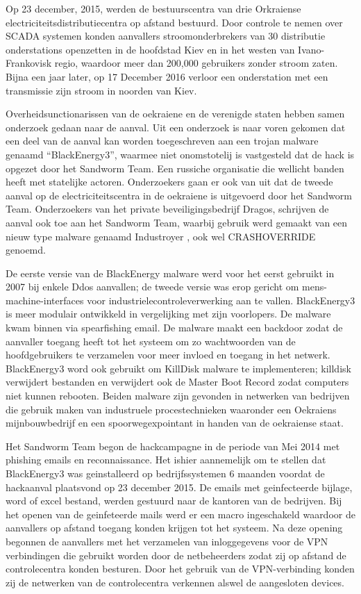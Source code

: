 		Op 23 december, 2015, werden de bestuurscentra van drie Orkraiense electriciteitsdistributiecentra
		op afstand bestuurd. Door controle te nemen over SCADA systemen konden aanvallers
		stroomonderbrekers van 30 distributie onderstations openzetten in de hoofdstad Kiev en in het
		westen van Ivano-Frankovisk regio, waardoor meer dan 200,000 gebruikers zonder stroom zaten.
		Bijna een jaar later, op 17 December 2016 verloor een onderstation met een transmissie zijn stroom
		in noorden van Kiev.
		
		Overheidsunctionarissen van de oekraiene en de verenigde staten hebben samen onderzoek gedaan
		naar de aanval. Uit een onderzoek is naar voren gekomen dat een deel van de aanval kan worden
		toegeschreven aan een trojan malware genaamd “BlackEnergy3”, waarmee niet onomstotelij is
		vastgesteld dat de hack is opgezet door het Sandworm Team. Een russiche organisatie die wellicht
		banden heeft met statelijke actoren. Onderzoekers gaan er ook van uit dat de tweede aanval op de
		electriciteitscentra in de oekraiene is uitgevoerd door het Sandworm Team. Onderzoekers van het
		private beveiligingsbedrijf Dragos, schrijven de aanval ook toe aan het Sandworm Team, waarbij
		gebruik werd gemaakt van een nieuw type malware genaamd Industroyer , ook wel CRASHOVERRIDE
		genoemd.
		
		De eerste versie van de BlackEnergy malware werd voor het eerst gebruikt in 2007 bij enkele Ddos
		aanvallen; de tweede versie was erop gericht om mens-machine-interfaces voor
		industrielecontroleverwerking aan te vallen. BlackEnergy3 is meer modulair ontwikkeld in
		vergelijking met zijn voorlopers. De malware kwam binnen via spearfishing email. De malware maakt
		een backdoor zodat de aanvaller toegang heeft tot het systeem om zo wachtwoorden van de
		hoofdgebruikers te verzamelen voor meer invloed en toegang in het netwerk. BlackEnergy3 word
		ook gebruikt om KillDisk malware te implementeren; killdisk verwijdert bestanden en verwijdert ook
		de Master Boot Record zodat computers niet kunnen rebooten. Beiden malware zijn gevonden in
		netwerken van bedrijven die gebruik maken van industruele procestechnieken waaronder een
		Oekraiens mijnbouwbedrijf en een spoorwegexpointant in handen van de oekraiense staat.
		
		Het Sandworm Team begon de hackcampagne in de periode van Mei 2014 met phishing emails en
		reconnaissance. Het ishier aannemelijk om te stellen dat BlackEnergy3 was geinstalleerd op
		bedrijfssystemen 6 maanden voordat de hackaanval plaatsvond op 23 december 2015. De emails
		met geinfecteerde bijlage, word of excel bestand, werden gestuurd naar de kantoren van de
		bedrijven. Bij het openen van de geinfeteerde mails werd er een macro ingeschakeld waardoor de
		aanvallers op afstand toegang konden krijgen tot het systeem. Na deze opening begonnen de
		aanvallers met het verzamelen van inloggegevens voor de VPN verbindingen die gebruikt worden
		door de netbeheerders zodat zij op afstand de controlecentra konden besturen. Door het gebruik van
		de VPN-verbinding konden zij de netwerken van de controlecentra verkennen alswel de aangesloten
		devices.
		
